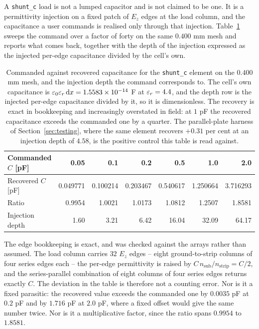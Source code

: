 A \texttt{shunt\_c} load is not a lumped capacitor and is not claimed to be one. It is a permittivity injection
on a fixed patch of $E_z$ edges at the load column, and the capacitance a user commands is realised only through
that injection. Table~\ref{tab:loads-shunt-cap} sweeps the command over a factor of forty on the same $0.400$ mm
mesh and reports what comes back, together with the depth of the injection expressed as the injected per-edge
capacitance divided by the cell's own.

\begin{table}[H]
  \centering
  \caption{Commanded against recovered capacitance for the \texttt{shunt\_c} element on the $0.400$ mm mesh, and
  the injection depth the command corresponds to. The cell's own capacitance is
  $\varepsilon_0\varepsilon_r\,\mathrm{d} x = 1.5583\times10^{-14}$ F at $\varepsilon_r = 4.4$, and the depth row is the injected per-edge
  capacitance divided by it, so it is dimensionless. The recovery is exact in bookkeeping and increasingly
  overstated in field: at $1$ pF the recovered capacitance exceeds the commanded one by a quarter. The
  parallel-plate harness of Section~\ref{sec:testing}, where the same element recovers $+0.31$ per cent at an
  injection depth of $4.58$, is the positive control this table is read against.}
  \label{tab:loads-shunt-cap}
  \begin{tabular}{@{}lrrrrrr@{}}
    \toprule
    Commanded $C$ [pF] & 0.05 & 0.1 & 0.2 & 0.5 & 1.0 & 2.0 \\
    \midrule
    Recovered $C$ [pF] & 0.049771 & 0.100214 & 0.203467 & 0.540617 & 1.250664 & 3.716293 \\
    Ratio              & 0.9954   & 1.0021   & 1.0173   & 1.0812   & 1.2507   & 1.8581   \\
    Injection depth    & 1.60     & 3.21     & 6.42     & 16.04    & 32.09    & 64.17    \\
    \bottomrule
  \end{tabular}
\end{table}

The edge bookkeeping is exact, and was checked against the arrays rather than assumed. The load column carries
$32$ $E_z$ edges -- eight ground-to-strip columns of four series edges each -- the per-edge permittivity is raised
by $C\,n_{\mathrm{sub}}/n_{\mathrm{strip}} = C/2$, and the series-parallel combination of eight columns of four
series edges returns exactly $C$. The deviation in the table is therefore not a counting error. Nor is it a fixed
parasitic: the recovered value exceeds the commanded one by $0.0035$ pF at $0.2$ pF and by $1.716$ pF at $2.0$ pF,
where a fixed offset would give the same number twice. Nor is it a multiplicative factor, since the ratio spans
$0.9954$ to $1.8581$.

